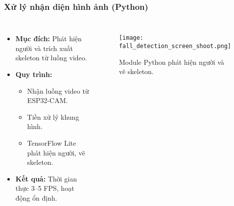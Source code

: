 \begin{frame}[t,fragile]
\frametitle{Xử lý nhận diện hình ảnh (Python)}
\begin{columns}[T]
    \begin{itemize}
        \item \textbf{Mục đích:} Phát hiện người và trích xuất skeleton từ luồng video.
        \item \textbf{Quy trình:}
        \begin{itemize}
            \item Nhận luồng video từ ESP32-CAM.
            \item Tiền xử lý khung hình.
            \item TensorFlow Lite phát hiện người, vẽ skeleton.
        \end{itemize}
        \item \textbf{Kết quả:} Thời gian thực 3–5 FPS, hoạt động ổn định.
    \end{itemize}

    \begin{figure}
        \centering
        \texttt{[image: fall\_detection\_screen\_shoot.png]}
        \caption{Module Python phát hiện người và vẽ skeleton.}
    \end{figure}
\end{columns}
\end{frame}

